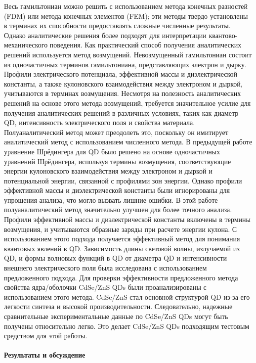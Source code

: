 \documentclass[a4paper,14pt]{extarticle}
\begin{document}
Весь гамильтониан можно решить с использованием метода конечных разностей (FDM) или метода конечных элементов (FEM); эти методы твердо установлены в терминах их способности предоставлять сложные численные результаты. Однако аналитические решения более подходят для интерпретации квантово-механического поведения. Как практический способ получения аналитических решений используется метод возмущений. Невозмущенный гамильтониан состоит из одночастичных терминов гамильтониана, представляющих электрон и дырку. Профили электрического потенциала, эффективной массы и диэлектрической константы, а также кулоновского взаимодействия между электроном и дыркой, учитываются в терминах возмущения. Несмотря на полезность аналитических решений на основе этого метода возмущений, требуется значительное усилие для получения аналитических решений в различных условиях, таких как диаметр QD, интенсивность электрического поля и свойства материала. Полуаналитический метод может преодолеть это, поскольку он имитирует аналитический метод с использованием численного метода. В предыдущей работе уравнение Шрёдингера для QD было решено на основе одночастичных уравнений Шрёдингера, используя термины возмущения, соответствующие энергии кулоновского взаимодействия между электроном и дыркой и потенциальной энергии, связанной с профилями зон энергии. Однако профили эффективной массы и диэлектрической константы были игнорированы для упрощения анализа, что могло вызвать лишние ошибки. В этой работе полуаналитический метод значительно улучшен для более точного анализа. Профили эффективной массы и диэлектрической константы включены в термины возмущения, и учитываются образные заряды при расчете энергии кулона. С использованием этого подхода получается эффективный метод для понимания квантовых явлений в QD. Зависимость длины световой волны, излучаемой из QD, и формы волновых функций в QD от диаметра QD и интенсивности внешнего электрического поля была исследована с использованием предложенного подхода. Для проверки эффективности предложенного метода свойства ядра/оболочки CdSe/ZnS QDs были проанализированы с использованием этого метода. CdSe/ZnS стал основной структурой QD из-за его легкости синтеза и высокой производительности. Следовательно, надежные сравнительные экспериментальные данные по CdSe/ZnS QDs могут быть получены относительно легко. Это делает CdSe/ZnS QDs подходящим тестовым средством для этой работы.

\paragraph{Результаты и обсуждение}
\end{document}
